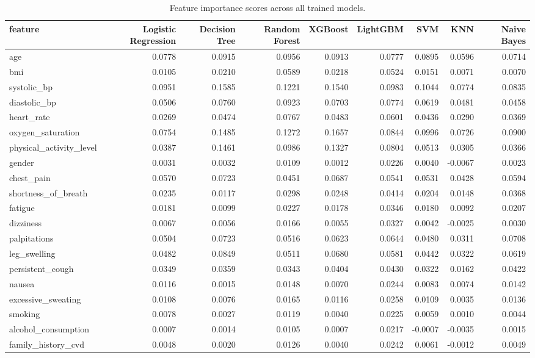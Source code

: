 \begin{table}[htbp]
  \centering
  \caption{Feature importance scores across all trained models.}
  \label{tab:feature_importance}
  \begin{tabular}{lrrrrrrrr}
    \toprule
    feature & Logistic Regression & Decision Tree & Random Forest & XGBoost & LightGBM & SVM & KNN & Naive Bayes \\
    \midrule
    age & 0.0778 & 0.0915 & 0.0956 & 0.0913 & 0.0777 & 0.0895 & 0.0596 & 0.0714 \\
    bmi & 0.0105 & 0.0210 & 0.0589 & 0.0218 & 0.0524 & 0.0151 & 0.0071 & 0.0070 \\
    systolic_bp & 0.0951 & 0.1585 & 0.1221 & 0.1540 & 0.0983 & 0.1044 & 0.0774 & 0.0835 \\
    diastolic_bp & 0.0506 & 0.0760 & 0.0923 & 0.0703 & 0.0774 & 0.0619 & 0.0481 & 0.0458 \\
    heart_rate & 0.0269 & 0.0474 & 0.0767 & 0.0483 & 0.0601 & 0.0436 & 0.0290 & 0.0369 \\
    oxygen_saturation & 0.0754 & 0.1485 & 0.1272 & 0.1657 & 0.0844 & 0.0996 & 0.0726 & 0.0900 \\
    physical_activity_level & 0.0387 & 0.1461 & 0.0986 & 0.1327 & 0.0804 & 0.0513 & 0.0305 & 0.0366 \\
    gender & 0.0031 & 0.0032 & 0.0109 & 0.0012 & 0.0226 & 0.0040 & -0.0067 & 0.0023 \\
    chest_pain & 0.0570 & 0.0723 & 0.0451 & 0.0687 & 0.0541 & 0.0531 & 0.0428 & 0.0594 \\
    shortness_of_breath & 0.0235 & 0.0117 & 0.0298 & 0.0248 & 0.0414 & 0.0204 & 0.0148 & 0.0368 \\
    fatigue & 0.0181 & 0.0099 & 0.0227 & 0.0178 & 0.0346 & 0.0180 & 0.0092 & 0.0207 \\
    dizziness & 0.0067 & 0.0056 & 0.0166 & 0.0055 & 0.0327 & 0.0042 & -0.0025 & 0.0030 \\
    palpitations & 0.0504 & 0.0723 & 0.0516 & 0.0623 & 0.0644 & 0.0480 & 0.0311 & 0.0708 \\
    leg_swelling & 0.0482 & 0.0849 & 0.0511 & 0.0680 & 0.0581 & 0.0442 & 0.0322 & 0.0619 \\
    persistent_cough & 0.0349 & 0.0359 & 0.0343 & 0.0404 & 0.0430 & 0.0322 & 0.0162 & 0.0422 \\
    nausea & 0.0116 & 0.0015 & 0.0148 & 0.0070 & 0.0244 & 0.0083 & 0.0074 & 0.0142 \\
    excessive_sweating & 0.0108 & 0.0076 & 0.0165 & 0.0116 & 0.0258 & 0.0109 & 0.0035 & 0.0136 \\
    smoking & 0.0078 & 0.0027 & 0.0119 & 0.0040 & 0.0225 & 0.0059 & 0.0010 & 0.0044 \\
    alcohol_consumption & 0.0007 & 0.0014 & 0.0105 & 0.0007 & 0.0217 & -0.0007 & -0.0035 & 0.0015 \\
    family_history_cvd & 0.0048 & 0.0020 & 0.0126 & 0.0040 & 0.0242 & 0.0061 & -0.0012 & 0.0049 \\
    \bottomrule
  \end{tabular}
\end{table}
